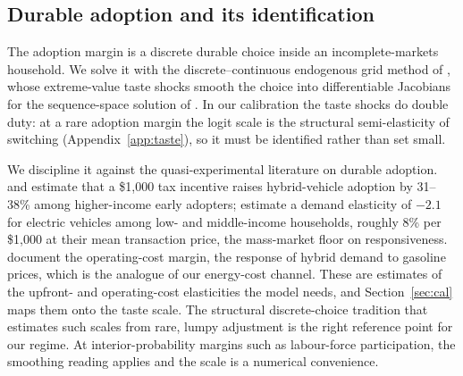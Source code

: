 \subsection{Durable adoption and its identification}

The adoption margin is a discrete durable choice inside an incomplete-markets
household. We solve it with the discrete--continuous endogenous grid method of
\citet{iskhakov2017endogenous}, whose extreme-value taste shocks smooth the choice into
differentiable Jacobians for the sequence-space solution of \citet{Auclert2021a}. In our calibration the taste shocks do double duty: at a rare adoption margin the
logit scale is the structural semi-elasticity of switching
(Appendix~\ref{app:taste}), so it must be identified rather than set small.

We discipline it against the quasi-experimental literature on durable adoption.
\citet{GallagherMuehlegger2011} and \citet{Chandra2010} estimate that a \$1{,}000 tax
incentive raises hybrid-vehicle adoption by 31--38\% among higher-income early
adopters; \citet{MuehleggerRapson2022} estimate a demand elasticity of $-2.1$ for
electric vehicles among low- and middle-income households, roughly 8\% per
\$1{,}000 at their mean transaction price, the mass-market floor on responsiveness.
\citet{BeresteanuLi2011} document the operating-cost margin, the response of
hybrid demand to gasoline prices, which is the analogue of our energy-cost channel. These are estimates of the
upfront- and operating-cost elasticities the model needs, and
Section~\ref{sec:cal} maps them onto the taste scale. The structural
discrete-choice tradition that estimates such scales from rare, lumpy adjustment
\citep{Rust1987} is the right reference point for our regime. At
interior-probability margins such as labour-force participation, the smoothing
reading applies and the scale is a numerical convenience.
